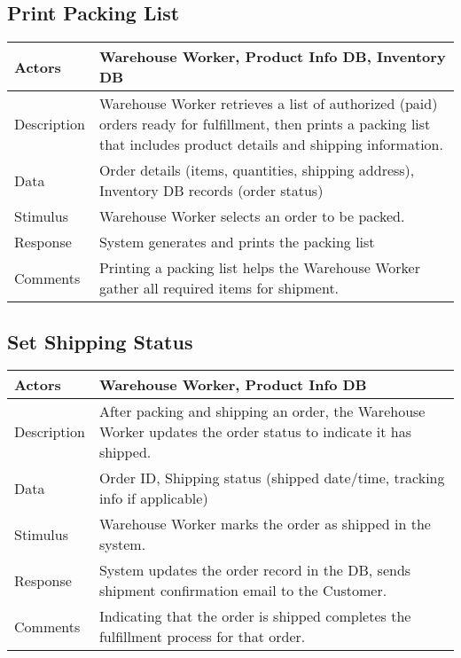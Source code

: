 \documentclass{report}
\begin{document}
    \subsection{Print Packing List}
    \bigbreak \noindent 
    \begin{center}
        \begin{tabular}{|p{4cm}|p{8cm}|}
            \hline
            Actors & 
            Warehouse Worker, Product Info DB, Inventory DB \\
            \hline
            Description & 
            Warehouse Worker retrieves a list of authorized (paid) orders 
            ready for fulfillment, then prints a packing list that 
            includes product details and shipping information. \\
            \hline
            Data & 
            Order details (items, quantities, shipping address), Inventory DB records (order status) \\
            \hline
            Stimulus & 
            Warehouse Worker selects an order to be packed. \\
            \hline
            Response & 
            System generates and prints the packing list \\
            \hline
            Comments & 
            Printing a packing list helps the Warehouse Worker gather 
            all required items for shipment. \\
            \hline
        \end{tabular}
    \end{center}

    \pagebreak 
    \subsection{Set Shipping Status}
    \bigbreak \noindent 
    \begin{center}
        \begin{tabular}{|p{4cm}|p{8cm}|}
            \hline
            Actors & 
            Warehouse Worker, Product Info DB \\
            \hline
            Description & 
            After packing and shipping an order, the Warehouse Worker 
            updates the order status to indicate it has shipped. \\
            \hline
            Data & 
            Order ID, Shipping status (shipped date/time, tracking info if applicable) \\
            \hline
            Stimulus & 
            Warehouse Worker marks the order as shipped in the system. \\
            \hline
            Response & 
            System updates the order record in the DB, sends 
            shipment confirmation email to the Customer. \\
            \hline
            Comments & 
            Indicating that the order is shipped completes the fulfillment 
            process for that order. \\
            \hline
        \end{tabular}
    \end{center}
\end{document}

